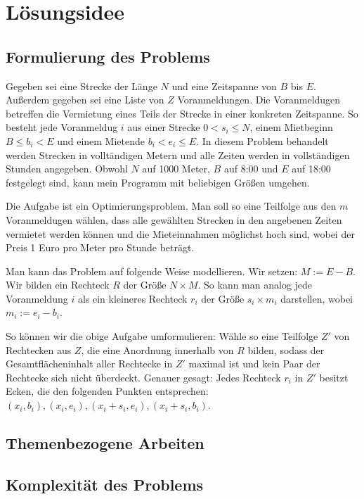 \documentclass[a4paper,10pt,ngerman]{scrartcl}
\newcommand{\TODO}[1]{\todo[inline]{TODO: #1}}
\begin{document}
\section{Lösungsidee}

\subsection{Formulierung des Problems}
Gegeben sei eine Strecke der Länge $N$ und eine Zeitspanne von $B$ bis $E$.
Außerdem gegeben sei eine Liste von $Z$ Voranmeldungen. 
Die Voranmeldugen betreffen die Vermietung eines Teils der Strecke in einer konkreten Zeitspanne.
So besteht jede Voranmeldug $i$ aus einer Strecke $0 < s_i \leqslant N$,
einem Mietbeginn $B \leqslant b_i < E$ und einem Mietende $b_i < e_i \leqslant E$.
In diesem Problem behandelt werden Strecken in volltändigen Metern 
und alle Zeiten werden in vollständigen Stunden angegeben.
Obwohl $N$ auf 1000 Meter, $B$ auf 8:00 und $E$ auf 18:00 festgelegt sind,
kann mein Programm mit beliebigen Größen umgehen.

Die Aufgabe ist ein Optimierungsproblem.
Man soll so eine Teilfolge aus den $m$ Voranmeldugen wählen,
dass alle gewählten Strecken in den angebenen Zeiten vermietet werden können
und die Mieteinnahmen möglichst hoch sind, wobei der Preis 1 Euro pro Meter pro Stunde beträgt.

Man kann das Problem auf folgende Weise modellieren. 
Wir setzen: $M := E - B$.
Wir bilden ein Rechteck $R$ der Größe $N \times M$.
So kann man analog jede Voranmeldung $i$ als ein kleineres Rechteck 
$r_i$ der Größe $s_i \times m_i$ darstellen, wobei $m_i := e_i - b_i$.

So können wir die obige Aufgabe umformulieren:
Wähle so eine Teilfolge $Z'$ von Rechtecken aus $Z$,
die eine Anordnung innerhalb von $R$ bilden,
sodass der Gesamtflächeninhalt aller Rechtecke in $Z'$ maximal ist und
kein Paar der Rechtecke sich nicht überdeckt.
Genauer gesagt: Jedes Rechteck $r_i$ in $Z'$ besitzt Ecken,
die den folgenden Punkten entsprechen:
$(x_i, b_i), (x_i, e_i), (x_i + s_i, e_i), (x_i + s_i, b_i)$.

\TODO{check, reformulate}

\subsection{Themenbezogene Arbeiten}

\subsection{Komplexität des Problems}
\end{document}
